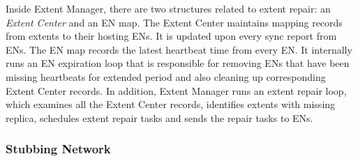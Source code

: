 Inside Extent Manager, there are two structures related to extent repair: an \emph{Extent Center} and an EN map. The Extent Center maintains mapping records from extents to their hosting ENs. It is updated upon every sync report from ENs. The EN map records the latest heartbeat time from every EN. It internally runs an EN expiration loop that is responsible for removing ENs that have been missing heartbeats for extended period and also cleaning up corresponding Extent Center records. In addition, Extent Manager runs an extent repair loop, which examines all the Extent Center records, identifies extents with missing replica, schedules extent repair tasks and sends the repair tasks to ENs.

\subsubsection{Stubbing Network}
\label{sec:method:model:dispath}



%

